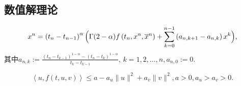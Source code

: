 \subsection{数值解理论}
\begin{equation}\label{L1格式}
    x^n=\left(t_n-t_{n-1}\right)^\alpha \Bigl(\Gamma(2-\alpha) f\left(t_n,x^n,\overline{x}^n\right) + \sum_{k=0}^{n-1} \left(a_{n,k+1}-a_{n,k}\right) x^k\Bigr),
\end{equation}
其中$a_{n,k}:=\frac{\left(t_n-t_{k-1}\right)^{1-\alpha}-\left(t_n-t_{k}\right)^{1-\alpha}}{t_k-t_{k-1}},\,k=1,2,\dots,n,a_{n,0}:=0$.

\begin{equation*}
    \left<u,f(t,u,v)\right>\leqslant a-a_u \|u\|^2+a_v \|v\|^2, a>0, a_u>a_v>0.
\end{equation*}

